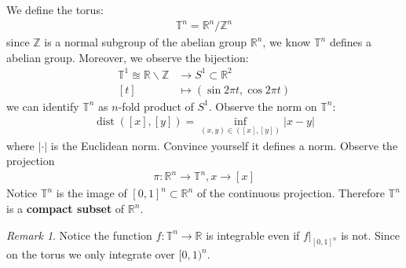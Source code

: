 \documentclass[a4paper,11pt,fleqn]{book}
\theoremstyle{definition}
\theoremstyle{remark}
\newtheorem*{remark}{Remark}
\DeclareMathOperator*{\dist}{dist}
\begin{document}
We define the torus:
\begin{align*}
	\mathbb{T}^n =  \mathbb{R}^n \slash \mathbb{Z}^n
\end{align*}
since $\mathbb{Z}$ is a normal subgroup of the abelian group $\mathbb{R}^n$, we know $\mathbb{T}^n$ defines a abelian group. Moreover, we observe the bijection:
\begin{align*}
	 \mathbb{T}^1 \approxeq \mathbb{R} \backslash \mathbb{Z} &\rightarrow S^1 \subset {\mathbb{R}^2}\\
	 [t] & \mapsto (\sin2 \pi t, \cos 2\pi t) 
\end{align*}
we can identify $\mathbb{T}^n$ as $n$-fold product of $S^1$. Observe the norm on $\mathbb{T}^n$:
	\begin{align*}
		\dist([x], [y]) = \inf_{(x, y)\in ([x], [y])} |x - y|
	\end{align*}
	where $|\cdot|$ is the Euclidean norm. Convince yourself it defines a norm. Observe the projection
	\begin{align*}
		\pi: \mathbb{R}^n \rightarrow \mathbb{T}^n, x \rightarrow [x]
	\end{align*}
	Notice $\mathbb{T}^n$ is the image of $[0, 1]^n \subset \mathbb{R}^n$ of the continuous projection. Therefore $\mathbb{T}^n$ is a \textbf{compact subset} of $\mathbb{R}^n$. \par 
	
\begin{remark}
Notice the function $f: \mathbb{T}^n \rightarrow \mathbb{R}$ is integrable even if $f |_{[0, 1]^n}$ is not. Since on the torus we only integrate over $[0, 1)^n$. 
\end{remark}
\end{document}
